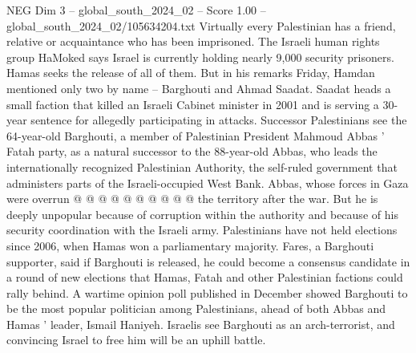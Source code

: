 \begin{textsample}{NEG Dim 3 – global\_south\_2024\_02 – Score 1.00 – global\_south\_2024\_02/105634204.txt}
Virtually every Palestinian has a friend, relative or acquaintance who has been imprisoned.
The Israeli human rights group HaMoked says Israel is currently holding nearly 9,000 security prisoners.
Hamas seeks the release of all of them.
But in his remarks Friday, Hamdan mentioned only two by name -- Barghouti and Ahmad Saadat.
Saadat heads a small faction that killed an Israeli Cabinet minister in 2001 and is serving a 30-year sentence for allegedly participating in attacks.
Successor Palestinians see the 64-year-old Barghouti, a member of Palestinian President Mahmoud Abbas ' Fatah party, as a natural successor to the 88-year-old Abbas, who leads the internationally recognized Palestinian Authority, the self-ruled government that administers parts of the Israeli-occupied West Bank.
Abbas, whose forces in Gaza were overrun @ @ @ @ @ @ @ @ @ @ the territory after the war.
But he is deeply unpopular because of corruption within the authority and because of his security coordination with the Israeli army.
Palestinians have not held elections since 2006, when Hamas won a parliamentary majority.
Fares, a Barghouti supporter, said if Barghouti is released, he could become a consensus candidate in a round of new elections that Hamas, Fatah and other Palestinian factions could rally behind.
A wartime opinion poll published in December showed Barghouti to be the most popular politician among Palestinians, ahead of both Abbas and Hamas ' leader, Ismail Haniyeh.
Israelis see Barghouti as an arch-terrorist, and convincing Israel to free him will be an uphill battle.

\end{textsample}
